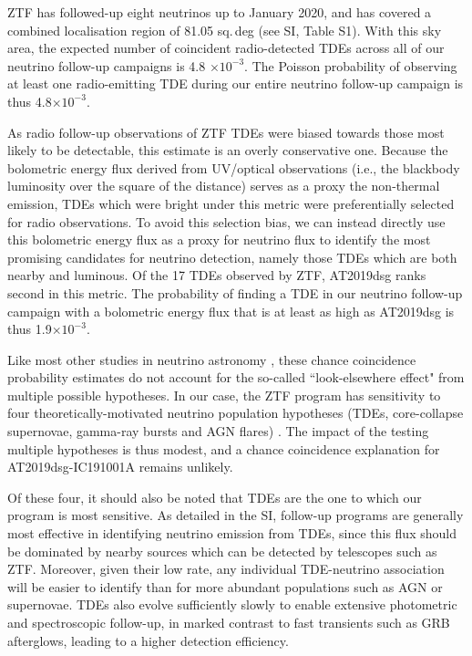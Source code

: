 ZTF has followed-up eight neutrinos up to January 2020, and has covered a combined localisation region of 81.05 sq.\,deg (see SI, Table S1). With this sky area, the expected number of coincident radio-detected TDEs across all of our neutrino follow-up campaigns is 4.8 $\times 10^{-3}$. The Poisson probability of observing at least one radio-emitting TDE during our entire neutrino follow-up campaign is thus 4.8$ \times 10^{-3}$. 

As radio follow-up observations of ZTF TDEs were biased towards those most likely to be detectable, this estimate is an overly conservative one. Because the bolometric energy flux derived from UV/optical observations (i.e., the blackbody luminosity over the square of the distance) serves as a proxy the non-thermal emission, TDEs which were bright under this metric were preferentially selected for radio observations. To avoid this selection bias, we can instead directly use this bolometric energy flux  as a proxy for neutrino flux to identify the most promising candidates for neutrino detection, namely those TDEs which are both nearby and luminous. Of the 17 TDEs observed by ZTF, AT2019dsg ranks second in this metric. The probability of finding a TDE in our neutrino follow-up campaign with a bolometric energy flux that is at least as high as AT2019dsg is thus 1.9$ \times 10^{-3}$. 

Like most other studies in neutrino astronomy , these chance coincidence probability estimates do not account for the so-called ``look-elsewhere effect" from multiple possible hypotheses. In our case, the ZTF program has sensitivity to four theoretically-motivated neutrino population hypotheses (TDEs, core-collapse supernovae, gamma-ray bursts and AGN flares) . The impact of the testing multiple hypotheses is thus modest, and a chance coincidence explanation for AT2019dsg-IC191001A remains unlikely.

Of these four, it should also be noted that TDEs are the one to which our program is most sensitive. As detailed in the SI, follow-up programs are generally most effective in identifying neutrino emission from TDEs, since this flux should be dominated by nearby sources which can be detected by telescopes such as ZTF. Moreover, given their low rate, any individual TDE-neutrino association will be easier to identify than for more abundant populations such as AGN or supernovae. TDEs also evolve sufficiently slowly to enable extensive photometric and spectroscopic follow-up, in marked contrast to fast transients such as GRB afterglows, leading to a higher detection efficiency.

